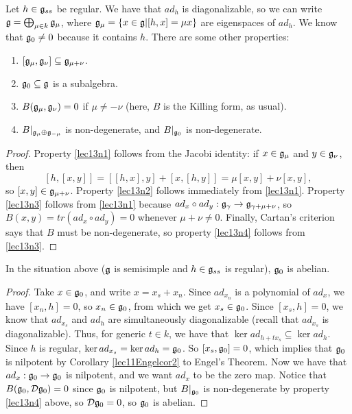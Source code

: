  Let $h\in \mathfrak{g}_{ss}$ be regular. We have that $ad_h$ is diagonalizable, so we can write
 $\mathfrak{g} = \bigoplus_{\mu\in k} \mathfrak{g}_\mu$, where $\mathfrak{g}_\mu = \{x\in \mathfrak{g}| [h,x]=\mu x\}$ are
 eigenspaces of $ad_h$. We know that $\mathfrak{g}_0\neq 0$ because it contains $h$. There are
 some other properties:
 \begin{enumerate}
 \item \label{lec13n1} $[\mathfrak{g}_\mu,\mathfrak{g}_\nu]\subseteq \mathfrak{g}_{\mu+\nu}$.%
 \item \label{lec13n2} $\mathfrak{g}_0\subseteq\mathfrak{g}$ is a subalgebra.%
 \item \label{lec13n3} $B(\mathfrak{g}_\mu,\mathfrak{g}_\nu) = 0$ if $\mu\neq -\nu$ (here, $B$ is the Killing form, as usual).%
 \item \label{lec13n4} $B|_{\mathfrak{g}_\mu \oplus \mathfrak{g}_{-\mu}}$ is non-degenerate, and
    $B|_{\mathfrak{g}_0}$ is non-degenerate.%
 \end{enumerate}
 \begin{proof}
 Property \ref{lec13n1} follows from the Jacobi identity: if $x\in \mathfrak{g}_\mu$ and $y\in
\mathfrak{g}_\nu$, then
 \[
    [h,[x,y]] = [[h,x],y] + [x,[h,y]] = \mu[x,y] + \nu[x,y],
 \]
 so $[x,y]\in \mathfrak{g}_{\mu+\nu}$. Property \ref{lec13n2} follows immediately from
 \ref{lec13n1}. Property \ref{lec13n3} follows from \ref{lec13n1} because $ad_x\circ
 ad_y:\mathfrak{g}_\gamma\to \mathfrak{g}_{\gamma+\mu+\nu}$, so $B(x,y)=tr(ad_x\circ ad_y)=0$ whenever
 $\mu+\nu\neq 0$. Finally, Cartan's criterion says that $B$ must be non-degenerate, so
 property \ref{lec13n4} follows from \ref{lec13n3}.
 \end{proof}
 \begin{proposition} \label{lec13P:g0abelian}
   In the situation above ($\mathfrak{g}$ is semisimple and $h\in \mathfrak{g}_{ss}$ is regular), $\mathfrak{g}_0$
   is abelian.
 \end{proposition}
 \begin{proof}
   Take $x\in \mathfrak{g}_0$, and write $x=x_s+x_n$. Since $ad_{x_n}$ is a polynomial of
   $ad_x$, we have $[x_n,h]=0$, so $x_n\in \mathfrak{g}_0$, from which we get $x_s\in\mathfrak{g}_0$.
   Since $[x_s,h]=0$, we know that $ad_{x_s}$ and $ad_h$ are simultaneously
   diagonalizable (recall that $ad_{x_s}$ is diagonalizable). Thus, for generic $t\in
   k$, we have that $\ker ad_{h+tx_s} \subseteq \ker ad_h$. Since $h$ is regular,
   $\ker ad_{x_s} = \ker ad_h=\mathfrak{g}_0$. So $[x_s,\mathfrak{g}_0]=0$, which implies that $\mathfrak{g}_0$ is
   nilpotent by Corollary \ref{lec11Engelcor2} to Engel's Theorem. Now we have that $ad_x:\mathfrak{g}_0\to \mathfrak{g}_0$ is nilpotent, and we want $ad_x$ to
   be the zero map. Notice that $B(\mathfrak{g}_0,\mathcal{D}\mathfrak{g}_0)=0$ since $\mathfrak{g}_0$ is nilpotent, but
   $B|_{\mathfrak{g}_0}$ is non-degenerate by property \ref{lec13n4} above, so $\mathcal{D}\mathfrak{g}_0=0$, so
   $\mathfrak{g}_0$ is abelian.
 \end{proof}

